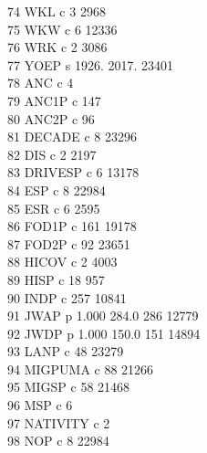 \documentclass[12pt]{article}
\begin{document}
      74  WKL        c                                  3      2968\\
      75  WKW        c                                  6     12336\\
      76  WRK        c                                  2      3086\\
      77  YOEP       s    1926.        2017.                  23401\\
      78  ANC        c                                  4\\
      79  ANC1P      c                                147\\
      80  ANC2P      c                                 96\\
      81  DECADE     c                                  8     23296\\
      82  DIS        c                                  2      2197\\
      83  DRIVESP    c                                  6     13178\\
      84  ESP        c                                  8     22984\\
      85  ESR        c                                  6      2595\\
      86  FOD1P      c                                161     19178\\
      87  FOD2P      c                                 92     23651\\
      88  HICOV      c                                  2      4003\\
      89  HISP       c                                 18       957\\
      90  INDP       c                                257     10841\\
      91  JWAP       p    1.000        284.0          286     12779\\
      92  JWDP       p    1.000        150.0          151     14894\\
      93  LANP       c                                 48     23279\\
      94  MIGPUMA    c                                 88     21266\\
      95  MIGSP      c                                 58     21468\\
      96  MSP        c                                  6\\
      97  NATIVITY   c                                  2\\
      98  NOP        c                                  8     22984\\
\end{document}
